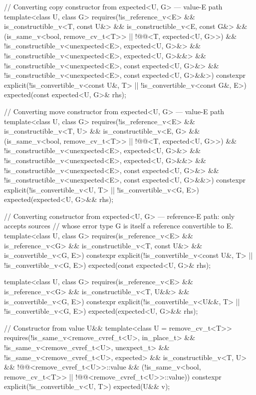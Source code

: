 \begin{codeblock}
{  // Converting copy constructor from expected<U, G> — value-E path
  template<class U, class G>
    requires(!is_reference_v<E> && is_constructible_v<T, const U&> &&
             is_constructible_v<E, const G&> &&
             (is_same_v<bool, remove_cv_t<T>> ||
              !@@<T, expected<U, G>>) &&
             !is_constructible_v<unexpected<E>, expected<U, G>&> &&
             !is_constructible_v<unexpected<E>, expected<U, G>&&> &&
             !is_constructible_v<unexpected<E>, const expected<U, G>&> &&
             !is_constructible_v<unexpected<E>, const expected<U, G>&&>)
  constexpr explicit(!is_convertible_v<const U&, T> || !is_convertible_v<const G&, E>)
      expected(const expected<U, G>& rhs);

  // Converting move constructor from expected<U, G> — value-E path
  template<class U, class G>
    requires(!is_reference_v<E> && is_constructible_v<T, U> &&
             is_constructible_v<E, G> &&
             (is_same_v<bool, remove_cv_t<T>> ||
              !@@<T, expected<U, G>>) &&
             !is_constructible_v<unexpected<E>, expected<U, G>&> &&
             !is_constructible_v<unexpected<E>, expected<U, G>&&> &&
             !is_constructible_v<unexpected<E>, const expected<U, G>&> &&
             !is_constructible_v<unexpected<E>, const expected<U, G>&&>)
  constexpr explicit(!is_convertible_v<U, T> || !is_convertible_v<G, E>)
      expected(expected<U, G>&& rhs);

  // Converting constructor from expected<U, G> — reference-E path: only accepts sources
  // whose error type G is itself a reference convertible to E.
  template<class U, class G>
    requires(is_reference_v<E> && is_reference_v<G> &&
             is_constructible_v<T, const U&> && is_convertible_v<G, E>)
  constexpr explicit(!is_convertible_v<const U&, T> || !is_convertible_v<G, E>)
      expected(const expected<U, G>& rhs);

  template<class U, class G>
    requires(is_reference_v<E> && is_reference_v<G> && is_constructible_v<T, U&&> &&
             is_convertible_v<G, E>)
  constexpr explicit(!is_convertible_v<U&&, T> || !is_convertible_v<G, E>)
      expected(expected<U, G>&& rhs);

  // Constructor from value U&&
  template<class U = remove_cv_t<T>>
    requires(!is_same_v<remove_cvref_t<U>, in_place_t> &&
             !is_same_v<remove_cvref_t<U>, unexpect_t> &&
             !is_same_v<remove_cvref_t<U>, expected> && is_constructible_v<T, U> &&
             !@@<remove_cvref_t<U>>::value &&
             (!is_same_v<bool, remove_cv_t<T>> ||
              !@@<remove_cvref_t<U>>::value))
  constexpr explicit(!is_convertible_v<U, T>) expected(U&& v);

}
\end{codeblock}
